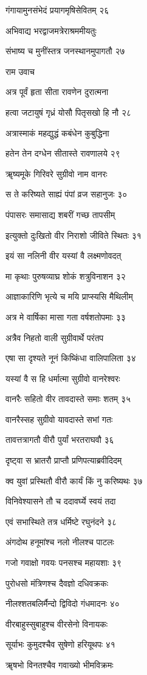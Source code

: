 गंगायामुनसंभेदं प्रयागमृषिसेवितम् २६

अभिवाद्य भरद्वाजमत्रेराश्रममीयतुः

संभाष्य च मुनींस्तत्र जनस्थानमुपागतौ २७

राम उवाच

अत्र पूर्वं हृता सीता रावणेन दुरात्मना

हत्वा जटायुषं गृध्रं योसौ पितृसखो हि नौ २८

अत्रास्माकं महद्युद्धं कबंधेन कुबुद्धिना

हतेन तेन दग्धेन सीतास्ते रावणालये २९

ॠष्यमूके गिरिवरे सुग्रीवो नाम वानरः

स ते करिष्यते साह्यं पंपां व्रज सहानुजः ३०

पंपासरः समासाद्य शबरीं गच्छ तापसीम्

इत्युक्तो दुःखितो वीर निराशो जीविते स्थितः ३१

इयं सा नलिनी वीर यस्यां वै लक्ष्मणोवदत्

मा कृथाः पुरुषव्याघ्र शोकं शत्रुविनाशन ३२

आज्ञाकारिणि भृत्ये च मयि प्राप्स्यसि मैथिलीम्

अत्र मे वार्षिका मासा गता वर्षशतोपमाः ३३

अत्रैव निहतो वाली सुग्रीवार्थे परंतप

एषा सा दृश्यते नूनं किष्किंधा वालिपालिता ३४

यस्यां वै स हि धर्मात्मा सुग्रीवो वानरेश्वरः

वानरैः सहितो वीर तावदास्ते समाः शतम् ३५

वानरैस्सह सुग्रीवो यावदास्ते सभां गतः

तावत्तत्रागतौ वीरौ पुर्यां भरतराघवौ ३६

दृष्ट्वा स भ्रातरौ प्राप्तौ प्रणिपत्याब्रवीदिदम्

क्व युवां प्रस्थितौ वीरौ कार्यं किं नु करिष्यथः ३७

विनिवेश्यासने तौ च ददावर्घ्ये स्वयं तदा

एवं सभास्थिते तत्र धर्मिष्टे रघुनंदने ३८

अंगदोथ हनूमांश्च नलो नीलश्च पाटलः

गजो गवाक्षो गवयः पनसश्च महायशाः ३९

पुरोधसो मंत्रिणश्च दैवज्ञो दधिवक्रकः

नीलश्शतबलिर्मैन्दो द्विविदो गंधमादनः ४०

वीरबाहुस्सुबाहुश्च वीरसेनो विनायकः

सूर्याभः कुमुदश्चैव सुषेणो हरियूथपः ४१

ॠषभो विनतश्चैव गवाख्यो भीमविक्रमः

